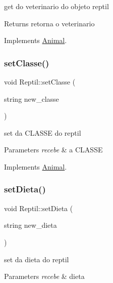 get do veterinario do objeto reptil 

\begin{DoxyReturn}{Returns}
retorna o veterinario 
\end{DoxyReturn}


Implements \mbox{\hyperlink{class_animal}{Animal}}.

\mbox{\label{class_reptil_a978a77ecb44649c065c1932520499143}} 
\subsubsection{\texorpdfstring{setClasse()}{setClasse()}}
{\footnotesize\ttfamily void Reptil\+::set\+Classe (\begin{DoxyParamCaption}\item[{string}]{new\+\_\+classe }\end{DoxyParamCaption})\hspace{0.3cm}{\ttfamily [virtual]}}



set da C\+L\+A\+S\+SE do reptil 


\begin{DoxyParams}{Parameters}
{\em recebe} & a C\+L\+A\+S\+SE \\
\hline
\end{DoxyParams}


Implements \mbox{\hyperlink{class_animal}{Animal}}.

\mbox{\label{class_reptil_abb1b6999128845c563daa55a4b0cbf92}} 
\subsubsection{\texorpdfstring{setDieta()}{setDieta()}}
{\footnotesize\ttfamily void Reptil\+::set\+Dieta (\begin{DoxyParamCaption}\item[{string}]{new\+\_\+dieta }\end{DoxyParamCaption})\hspace{0.3cm}{\ttfamily [virtual]}}



set da dieta do reptil 


\begin{DoxyParams}{Parameters}
{\em recebe} & dieta \\
\hline
\end{DoxyParams}


